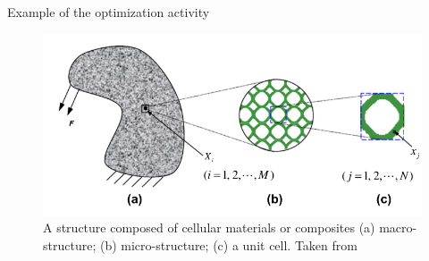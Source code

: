 \documentclass[10pt]{beamer}
\begin{document}
\begin{frame}{Example of the optimization activity}
\begin{figure}[H]
\begin{centering}
\includegraphics[scale=0.35]{optimiTopo.png}
\par\end{centering}

\caption{\label{fig:N=2} A structure composed of cellular materials or composites (a) macro-structure; (b) micro-structure; (c) a unit cell. Taken from \cite{Huang2014}}

\end{figure}
\end{frame}
\end{document}
